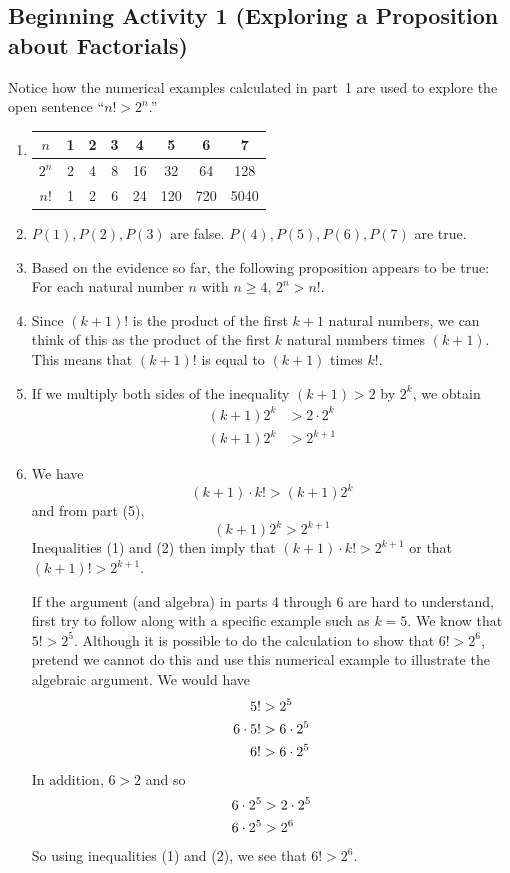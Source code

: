\documentclass[11pt]{article}
\begin{document}
\subsection*{Beginning Activity 1 (Exploring a Proposition about Factorials)}
Notice how the numerical examples calculated in part~1 are used to explore the open sentence ``$n! > 2^n$.''
\begin{enumerate}
\item
\begin{tabular}[t]{| c | c | c | c | c | c | c | c |} \hline
$n$  &  1  &  2  &  3  &  4  &  5  &  6  &  7  \\ \hline
$2^n$  &  2  &  4  &  8  &  16  &  32  &  64  &  128  \\ \hline
$n!$  &  1  &  2  &  6  &  24  &  120  &  720  &  5040  \\ \hline
\end{tabular}
\item $P(1), P(2), P(3)$ are false.  $P(4), P(5), P(6), P(7)$ are true.
\item Based on the evidence so far, the following proposition appears to be true:  For each natural number  
$n$ with $n \geq 4$, $2^n > n!$. 
\item Since $(k + 1)!$ is the product of the first $k + 1$ natural numbers, we can think of this as the product of the first $k$ natural numbers times $(k + 1)$.  This means that $(k + 1)!$ is equal to $(k + 1)$ times $k!$.
\item If we multiply both sides of the inequality $(k + 1) > 2$ by $2^k$, we obtain 
\begin{align*}
(k + 1)2^k &> 2 \cdot 2^k \\
(k + 1)2^k &> 2^{k+1}
\end{align*}
\item We have
\begin{equation} 
(k + 1)\cdot k! > (k + 1) 2^k 
\end{equation}
and from part (5),
\begin{equation}
(k + 1)2^k > 2^{k+1}
\end{equation}
Inequalities (1) and (2) then imply that $(k + 1)\cdot k! > 2^{k+1}$ or that $(k + 1)! > 2^{k+1}$.

\eighth
If the argument (and algebra) in parts 4 through 6 are hard to understand, first try to follow along with a specific example such as $k = 5$.  We know that $5! > 2^5$.  Although it is possible to do the calculation to show that $6! > 2^6$, pretend we cannot do this and use this numerical example to illustrate the algebraic argument.  We would have
\setcounter{equation}{0}
\begin{align}
5! &> 2^5 \notag \\ 
6\cdot 5! &> 6\cdot 2^5 \notag \\
6! &> 6\cdot 2^5
\end{align}
In addition, $6 > 2$ and so
\begin{align}
6 \cdot 2^5 &> 2 \cdot 2^5 \notag \\
6 \cdot 2^5 &> 2^6
\end{align}
So using inequalities (1) and (2), we see that $6! > 2^6$.


\end{enumerate}
\end{document}
